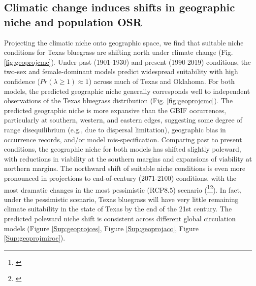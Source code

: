 \documentclass[12pt]{article}\usepackage[]{graphicx}\usepackage[dvipsnames]{xcolor}
\newcommand{\tom}[2]{{\color{red}{#1}}\footnote{\textit{\color{red}{#2}}}}
\newcommand{\jacob}[2]{{\color{blue}{#1}}\footnote{\textit{\color{blue}{#2}}}}
\begin{document}
\subsection*{Climatic change induces shifts in geographic niche and population OSR}
Projecting the climatic niche onto geographic space, we find that suitable niche conditions for Texas bluegrass are shifting north under climate change (Fig. \ref{fig:geoprojcmc}). 
Under past (1901-1930) and present (1990-2019) conditions, the two-sex and female-dominant models predict widespread suitability with high confidence ($Pr(\lambda \ge 1) \approx 1$) across much of Texas and Oklahoma. 
For both models, the predicted geographic niche generally corresponds well to independent observations of the Texas bluegrass distribution (Fig. \ref{fig:geoprojcmc}).
The predicted geographic niche is more expansive than the GBIF occurrences, particularly at southern, western, and eastern edges, suggesting some degree of range disequilibrium (e.g., due to dispersal limitation), geographic bias in occurrence records, and/or model mis-specification. 
Comparing past to present conditions, the geographic niche for both models has shifted slightly poleward, with reductions in viability at the southern margins and expansions of viability at northern margins. 
The northward shift of suitable niche conditions is even more pronounced in projections to end-of-century (2071-2100) conditions, with the most dramatic changes in the most pessimistic (RCP8.5) scenario (\jacob{Fig. \ref{fig:geoprojcmc}.}{I am not sure if we need a title for each panel. }\tom{}{I am not sure what you are asking but I like the figure as it is. But you can remove one of the two lambda color ramps, since they are the same.}). 
In fact, under the pessimistic scenario, Texas bluegrass will have very little remaining climate suitability in the state of Texas by the end of the 21st century. 
The predicted poleward niche shift is consistent across different global circulation models (Figure \ref{Sup:geoprojces}, Figure \ref{Sup:geoprojacc}, Figure \ref{Sup:geoprojmiroc}). 
\end{document}
